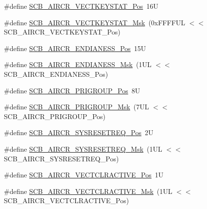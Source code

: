 \begin{DoxyCompactItemize}
\item 
\#define \mbox{\hyperlink{group___c_m_s_i_s___s_c_b_gaec404750ff5ca07f499a3c06b62051ef}{S\+C\+B\+\_\+\+A\+I\+R\+C\+R\+\_\+\+V\+E\+C\+T\+K\+E\+Y\+S\+T\+A\+T\+\_\+\+Pos}}~16U
\item 
\#define \mbox{\hyperlink{group___c_m_s_i_s___s_c_b_gabacedaefeefc73d666bbe59ece904493}{S\+C\+B\+\_\+\+A\+I\+R\+C\+R\+\_\+\+V\+E\+C\+T\+K\+E\+Y\+S\+T\+A\+T\+\_\+\+Msk}}~(0x\+F\+F\+F\+F\+U\+L $<$$<$ S\+C\+B\+\_\+\+A\+I\+R\+C\+R\+\_\+\+V\+E\+C\+T\+K\+E\+Y\+S\+T\+A\+T\+\_\+\+Pos)
\item 
\#define \mbox{\hyperlink{group___c_m_s_i_s___s_c_b_gad31dec98fbc0d33ace63cb1f1a927923}{S\+C\+B\+\_\+\+A\+I\+R\+C\+R\+\_\+\+E\+N\+D\+I\+A\+N\+E\+S\+S\+\_\+\+Pos}}~15U
\item 
\#define \mbox{\hyperlink{group___c_m_s_i_s___s_c_b_ga2f571f93d3d4a6eac9a3040756d3d951}{S\+C\+B\+\_\+\+A\+I\+R\+C\+R\+\_\+\+E\+N\+D\+I\+A\+N\+E\+S\+S\+\_\+\+Msk}}~(1\+U\+L $<$$<$ S\+C\+B\+\_\+\+A\+I\+R\+C\+R\+\_\+\+E\+N\+D\+I\+A\+N\+E\+S\+S\+\_\+\+Pos)
\item 
\#define \mbox{\hyperlink{group___c_m_s_i_s___s_c_b_gaca155deccdeca0f2c76b8100d24196c8}{S\+C\+B\+\_\+\+A\+I\+R\+C\+R\+\_\+\+P\+R\+I\+G\+R\+O\+U\+P\+\_\+\+Pos}}~8U
\item 
\#define \mbox{\hyperlink{group___c_m_s_i_s___s_c_b_ga8be60fff03f48d0d345868060dc6dae7}{S\+C\+B\+\_\+\+A\+I\+R\+C\+R\+\_\+\+P\+R\+I\+G\+R\+O\+U\+P\+\_\+\+Msk}}~(7\+U\+L $<$$<$ S\+C\+B\+\_\+\+A\+I\+R\+C\+R\+\_\+\+P\+R\+I\+G\+R\+O\+U\+P\+\_\+\+Pos)
\item 
\#define \mbox{\hyperlink{group___c_m_s_i_s___s_c_b_gaffb2737eca1eac0fc1c282a76a40953c}{S\+C\+B\+\_\+\+A\+I\+R\+C\+R\+\_\+\+S\+Y\+S\+R\+E\+S\+E\+T\+R\+E\+Q\+\_\+\+Pos}}~2U
\item 
\#define \mbox{\hyperlink{group___c_m_s_i_s___s_c_b_gaae1181119559a5bd36e62afa373fa720}{S\+C\+B\+\_\+\+A\+I\+R\+C\+R\+\_\+\+S\+Y\+S\+R\+E\+S\+E\+T\+R\+E\+Q\+\_\+\+Msk}}~(1\+U\+L $<$$<$ S\+C\+B\+\_\+\+A\+I\+R\+C\+R\+\_\+\+S\+Y\+S\+R\+E\+S\+E\+T\+R\+E\+Q\+\_\+\+Pos)
\item 
\#define \mbox{\hyperlink{group___c_m_s_i_s___s_c_b_gaa30a12e892bb696e61626d71359a9029}{S\+C\+B\+\_\+\+A\+I\+R\+C\+R\+\_\+\+V\+E\+C\+T\+C\+L\+R\+A\+C\+T\+I\+V\+E\+\_\+\+Pos}}~1U
\item 
\#define \mbox{\hyperlink{group___c_m_s_i_s___s_c_b_ga212c5ab1c1c82c807d30d2307aa8d218}{S\+C\+B\+\_\+\+A\+I\+R\+C\+R\+\_\+\+V\+E\+C\+T\+C\+L\+R\+A\+C\+T\+I\+V\+E\+\_\+\+Msk}}~(1\+U\+L $<$$<$ S\+C\+B\+\_\+\+A\+I\+R\+C\+R\+\_\+\+V\+E\+C\+T\+C\+L\+R\+A\+C\+T\+I\+V\+E\+\_\+\+Pos)
$$
\end{DoxyCompactItemize}
